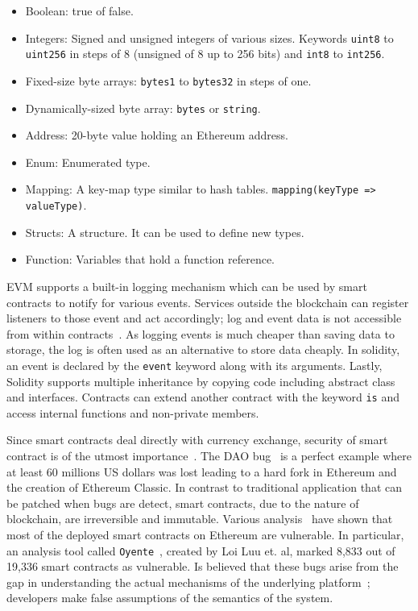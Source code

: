 \begin{itemize}
  \item Boolean: true of false.
  \item Integers: Signed and unsigned integers of various sizes. Keywords \verb|uint8| to \verb|uint256| in steps of  8 (unsigned of 8 up to 256 bits) and \verb|int8| to  \verb|int256|.
  \item Fixed-size byte arrays: \verb|bytes1| to  \verb|bytes32| in steps of one.
  \item Dynamically-sized byte array: \verb|bytes| or \verb|string|.
  \item Address: 20-byte value holding an Ethereum address.
  \item Enum: Enumerated type.
  \item Mapping: A key-map type similar to hash tables. \verb|mapping(keyType => valueType)|.
  \item Structs: A structure. It can be used to define new types.
  \item Function: Variables that hold a function reference.
\end{itemize}

EVM supports a built-in logging mechanism which can be used by smart contracts to notify for various events. Services outside the blockchain can register listeners to those event and act accordingly; log and event data is not accessible from within contracts~\cite{solidity}. As logging events is much cheaper than saving data to storage, the log is often used as an alternative to store data cheaply. In solidity, an event is declared by the \verb|event| keyword along with its arguments. Lastly, Solidity supports multiple inheritance by copying code including abstract class and interfaces. Contracts can extend another contract with the keyword \verb|is| and access internal functions and non-private members.

Since smart contracts deal directly with currency exchange, security of smart contract is of the utmost importance~\cite{safe_smart_contracts, smart_contracts_smarter}. The DAO bug~\cite{dao, dao_2} is a perfect example where at least 60 millions US dollars was lost leading to a hard fork in Ethereum and the creation of Ethereum Classic. In contrast to traditional application that can be patched when bugs are detect, smart contracts, due to the nature of blockchain, are irreversible and immutable. Various analysis~\cite{safe_smart_contracts, smart_contracts_smarter} have shown that most of the deployed smart contracts on Ethereum are vulnerable. In particular, an analysis tool called \verb|Oyente|~\cite{smart_contracts_smarter}, created by Loi Luu et. al, marked 8,833 out of 19,336 smart contracts as vulnerable. Is believed that these bugs arise from the gap in understanding the actual mechanisms of the underlying platform~\cite{smart_contracts_smarter}; developers make false assumptions of the semantics of the system.

